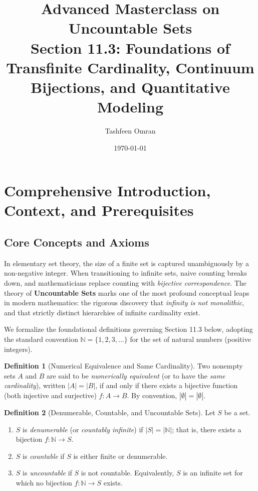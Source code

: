 \documentclass[11pt, letterpaper]{article}
\title{\textbf{Advanced Masterclass on Uncountable Sets}\\
\large Section 11.3: Foundations of Transfinite Cardinality, Continuum Bijections, and Quantitative Modeling}
\author{Tashfeen Omran}
\date{\today}
\theoremstyle{definition}
\newtheorem{definition}{Definition}[section]
\theoremstyle{remark}
\begin{document}
\maketitle
\tableofcontents
\newpage

\section{Comprehensive Introduction, Context, and Prerequisites}

\subsection{Core Concepts and Axioms}

In elementary set theory, the size of a finite set is captured unambiguously by a non-negative integer. When transitioning to infinite sets, naive counting breaks down, and mathematicians replace counting with \emph{bijective correspondence}. The theory of \textbf{Uncountable Sets} marks one of the most profound conceptual leaps in modern mathematics: the rigorous discovery that \emph{infinity is not monolithic}, and that strictly distinct hierarchies of infinite cardinality exist.

We formalize the foundational definitions governing Section 11.3 below, adopting the standard convention $\mathbb{N} = \{1, 2, 3, \dots\}$ for the set of natural numbers (positive integers).

\begin{definition}[Numerical Equivalence and Same Cardinality]
Two nonempty sets $A$ and $B$ are said to be \emph{numerically equivalent} (or to have the \emph{same cardinality}), written $|A| = |B|$, if and only if there exists a bijective function (both injective and surjective) $f : A \to B$. By convention, $|\emptyset| = |\emptyset|$.
\end{definition}

\begin{definition}[Denumerable, Countable, and Uncountable Sets]
Let $S$ be a set.
\begin{enumerate}[label=(\roman*)]
    \item $S$ is \emph{denumerable} (or \emph{countably infinite}) if $|S| = |\mathbb{N}|$; that is, there exists a bijection $f : \mathbb{N} \to S$.
    \item $S$ is \emph{countable} if $S$ is either finite or denumerable.
    \item $S$ is \emph{uncountable} if $S$ is not countable. Equivalently, $S$ is an infinite set for which no bijection $f : \mathbb{N} \to S$ exists.
\end{enumerate}
\end{definition}
\end{document}

